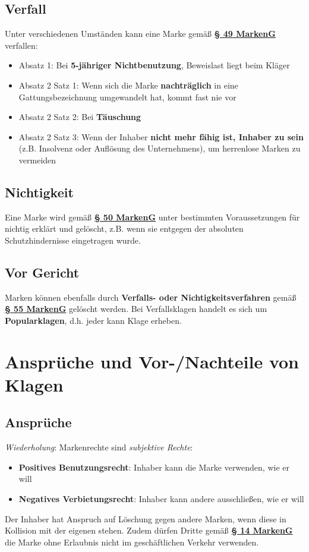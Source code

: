 \documentclass[12pt,A4]{extarticle}
\newcommand{\highlight}[1]{\textcolor{highlightColor}{\textbf{#1}}}
\newcommand{\markenG}[2][]{\textbf{\textcolor{markenGesetzLink}{\href{https://www.gesetze-im-internet.de/markeng/__#2.html}{§ #2 \ifthenelse{\equal{#1}{}}{}{#1 }MarkenG}}}}
\begin{document}
\subsection{Verfall}
Unter verschiedenen Umständen kann eine Marke gemäß \markenG{49} verfallen:
\begin{itemize}
  \item{Absatz 1: Bei \textbf{5-jähriger Nichtbenutzung}, Beweislast liegt beim Kläger}
  \item{Absatz 2 Satz 1: Wenn sich die Marke \textbf{nachträglich} in eine Gattungsbezeichnung umgewandelt hat, kommt fast nie vor}
  \item{Absatz 2 Satz 2: Bei \textbf{Täuschung}}
  \item{Absatz 2 Satz 3: Wenn der Inhaber \textbf{nicht mehr fähig ist, Inhaber zu sein} (z.B. Insolvenz oder Auflösung des Unternehmens), um herrenlose Marken zu vermeiden}
\end{itemize}

\subsection{Nichtigkeit}
Eine Marke wird gemäß \markenG{50} unter bestimmten Voraussetzungen für nichtig erklärt und gelöscht, z.B. wenn sie entgegen der absoluten Schutzhindernisse eingetragen wurde.

\subsection{Vor Gericht}
Marken können ebenfalls durch \textbf{Verfalls- oder Nichtigkeitsverfahren} gemäß \markenG{55} gelöscht werden. Bei Verfallsklagen handelt es sich um \highlight{Popularklagen}, d.h. jeder kann Klage erheben.

\section{Ansprüche und Vor-/Nachteile von Klagen}
\subsection{Ansprüche}\label{sec:MarkenAnsprueche}
\textit{Wiederholung}: Markenrechte sind \textit{subjektive Rechte}:
\begin{itemize}
  \item{\textbf{Positives Benutzungsrecht}: Inhaber kann die Marke verwenden, wie er will}
  \item{\textbf{Negatives Verbietungsrecht}: Inhaber kann andere ausschließen, wie er will}
\end{itemize}
Der Inhaber hat Anspruch auf Löschung gegen andere Marken, wenn diese in Kollision mit der eigenen stehen. Zudem dürfen Dritte gemäß \markenG[Abs. 2]{14} die Marke ohne Erlaubnis nicht im geschäftlichen Verkehr verwenden.
\end{document}
